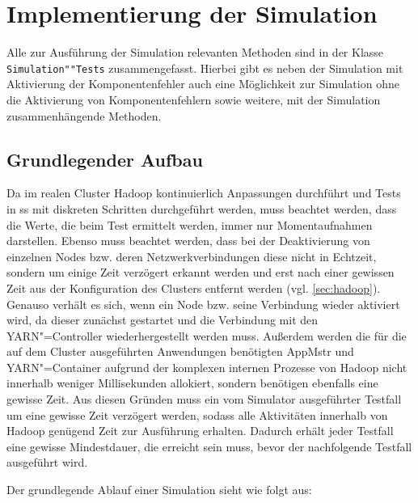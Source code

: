 \section{Implementierung der Simulation}
\label{sec:implSimulation}

Alle zur Ausführung der Simulation relevanten Methoden sind in der Klasse \texttt{Simulation""Tests} zusammengefasst.
Hierbei gibt es neben der Simulation mit Aktivierung der Komponentenfehler auch eine Möglichkeit zur Simulation ohne die Aktivierung von Komponentenfehlern sowie weitere, mit der Simulation zusammenhängende Methoden.

\subsection{Grundlegender Aufbau}
\label{subsec:simulationBasics}

Da im realen Cluster Hadoop kontinuierlich Anpassungen durchführt und Tests in \gls{ss} mit diskreten Schritten durchgeführt werden, muss beachtet werden, dass die Werte, die beim Test ermittelt werden, immer nur Momentaufnahmen darstellen.
Ebenso muss beachtet werden, dass bei der Deaktivierung von einzelnen Nodes bzw. deren Netzwerkverbindungen diese nicht in Echtzeit, sondern um einige Zeit verzögert erkannt werden und erst nach einer gewissen Zeit aus der Konfiguration des Clusters entfernt werden (vgl. \cref{sec:hadoop}).
Genauso verhält es sich, wenn ein Node bzw. seine Verbindung wieder aktiviert wird, da dieser zunächst gestartet und die Verbindung mit den YARN"=Controller wiederhergestellt werden muss.
Außerdem werden die für die auf dem Cluster ausgeführten Anwendungen benötigten \gls{AppMstr} und YARN"=Container aufgrund der komplexen internen Prozesse von Hadoop nicht innerhalb weniger Millisekunden allokiert, sondern benötigen ebenfalls eine gewisse Zeit.
Aus diesen Gründen muss ein vom Simulator ausgeführter Testfall um eine gewisse Zeit verzögert werden, sodass alle Aktivitäten innerhalb von Hadoop genügend Zeit zur Ausführung erhalten.
Dadurch erhält jeder Testfall eine gewisse Mindestdauer, die erreicht sein muss, bevor der nachfolgende Testfall ausgeführt wird.

Der grundlegende Ablauf einer Simulation sieht wie folgt aus:

